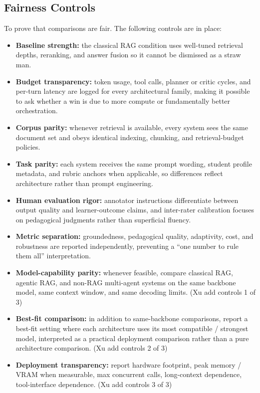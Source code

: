\subsection{Fairness Controls}

To prove that comparisons are fair. The following controls are in place:

\begin{itemize}[leftmargin=*]
    \item \textbf{Baseline strength:} the classical RAG condition uses well-tuned retrieval depths, reranking, and answer fusion so it cannot be dismissed as a straw man.
    \item \textbf{Budget transparency:} token usage, tool calls, planner or critic cycles, and per-turn latency are logged for every architectural family, making it possible to ask whether a win is due to more compute or fundamentally better orchestration.
    \item \textbf{Corpus parity:} whenever retrieval is available, every system sees the same document set and obeys identical indexing, chunking, and retrieval-budget policies.
    \item \textbf{Task parity:} each system receives the same prompt wording, student profile metadata, and rubric anchors when applicable, so differences reflect architecture rather than prompt engineering.
    \item \textbf{Human evaluation rigor:} annotator instructions differentiate between output quality and learner-outcome claims, and inter-rater calibration focuses on pedagogical judgments rather than superficial fluency.
    \item \textbf{Metric separation:} groundedness, pedagogical quality, adaptivity, cost, and robustness are reported independently, preventing a ``one number to rule them all'' interpretation.
    \item \textbf{Model-capability parity:} whenever feasible, compare classical RAG, agentic RAG, and non-RAG multi-agent systems on the same backbone model, same context window, and same decoding limits. (Xu add controls 1 of 3)
    \item \textbf{Best-fit comparison:} in addition to same-backbone comparisons, report a best-fit setting where each architecture uses its most compatible / strongest model, interpreted as a practical deployment comparison rather than a pure architecture comparison. (Xu add controls 2 of 3)
    \item \textbf{Deployment transparency:} report hardware footprint, peak memory / VRAM when measurable, max concurrent calls, long-context dependence, tool-interface dependence. (Xu add controls 3 of 3)
    
    
\end{itemize}

